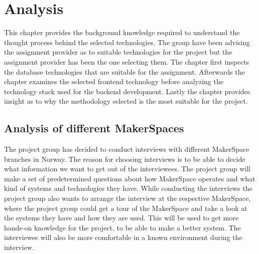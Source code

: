 \chapter{Analysis}
This chapter provides the background knowledge required to understand the thought process behind the selected technologies.
The group have been advising the assignment provider as to suitable technologies for the project but the assignment provider has been the one selecting them.
The chapter first inspects the database technologies that are suitable for the assignment.
Afterwards the chapter examines the selected frontend technology before analyzing the technology stack used for the backend development.
Lastly the chapter provides insight as to why the methodology selected is the most suitable for the project.

\section{Analysis of different MakerSpaces}
The project group has decided to conduct interviews with different MakerSpace branches in Norway. The reason for choosing interviews is to be able to decide what information we want to get out of the interviewees. The project group will make a set of predetermined questions about how MakerSpace operates and what kind of systems and technologies they have. While conducting the interviews the project group also wants to arrange the interview at the respective MakerSpace, where the project group could get a tour of the MakerSpace and take a look at the systems they have and how they are used. This will be used to get more hands-on knowledge for the project, to be able to make a better system. The interviewee will also be more comfortable in a known environment during the interview.

